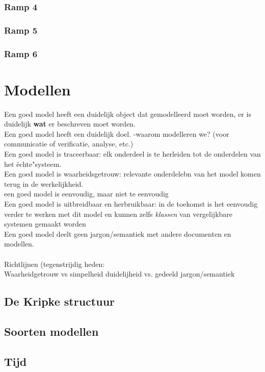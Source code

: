 \documentclass{article}
\begin{document}
\subsubsection{Ramp 4}
\subsubsection{Ramp 5}
\subsubsection{Ramp 6}

\section{Modellen}
Een goed model heeft een duidelijk object dat gemodelleerd moet worden, er is duidelijk \textbf{wat} er beschreven moet worden.
\\
Een goed model heeft een duidelijk doel.
-waarom modelleren we? (voor communicatie of verificatie, analyse, etc.)
\\
Een goed model is traceerbaar: elk onderdeel is te herleiden tot de onderdelen van het ëchte"systeem.
\\
Een goed model is waarheidsgetrouw: relevante onderdelebn van het model komen terug in de werkelijkheid.
\\
een goed model is eenvoudig, maar niet te eenvoudig
\\
Een goed model is uitbreidbaar en herbruikbaar: in de toekomst is het eenvoudig verder te werken met dit model en kunnen zelfs \textit{klassen} van vergelijkbare  systemen gemaakt worden
\\
Een goed model deelt geen jargon/semantiek met andere documenten en modellen.
\\\\
Richtlijnen (tegenstrijdig heden:
\\
Waarheidgetrouw vs simpelheid
duidelijheid vs. gedeeld jargon/semantiek
\subsection{De Kripke structuur}

\subsection{Soorten modellen}

\subsection{Tijd}
\end{document}
